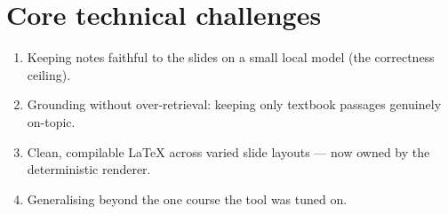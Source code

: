 \documentclass[11pt,a4paper]{article}
\begin{document}
\section{Core technical challenges}
\begin{enumerate}[leftmargin=1.4em]
\item Keeping notes faithful to the slides on a small local model (the correctness ceiling).
\item Grounding without over-retrieval: keeping only textbook passages genuinely on-topic.
\item Clean, compilable \LaTeX{} across varied slide layouts --- now owned by the deterministic renderer.
\item Generalising beyond the one course the tool was tuned on.
\end{enumerate}
\end{document}
